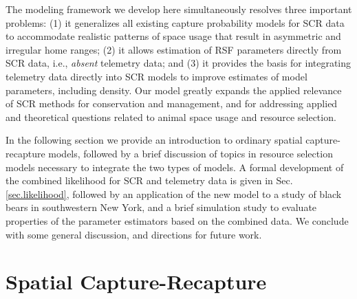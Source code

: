 \documentclass[12pt]{article}
\begin{document}
The modeling framework we develop here simultaneously resolves three
important
problems: (1) it generalizes all existing capture probability models
for SCR data to accommodate realistic patterns of space usage that
result in asymmetric and irregular home
ranges;
(2) it allows estimation of RSF parameters directly from SCR data,
i.e., {\it absent} telemetry data; and (3) it provides the basis for
integrating telemetry data directly into SCR models to improve
estimates of model parameters, including density.  Our model greatly
expands the applied relevance of SCR methods for conservation and
management, and for addressing applied and theoretical questions
related to animal space usage and resource selection.

In the following section we provide an introduction to ordinary
spatial capture-recapture models, followed by a brief discussion of
topics in resource selection models necessary to integrate the two
types of models. A formal development of the combined likelihood for
SCR and telemetry data is given in Sec. \ref{sec.likelihood}, followed
by an application of the new model to a study of black bears in
southwestern New York, and a brief simulation study to evaluate
properties of the parameter estimators based on the combined data. We
conclude with some general discussion, and directions for future work.


\section{Spatial Capture-Recapture}
\end{document}
